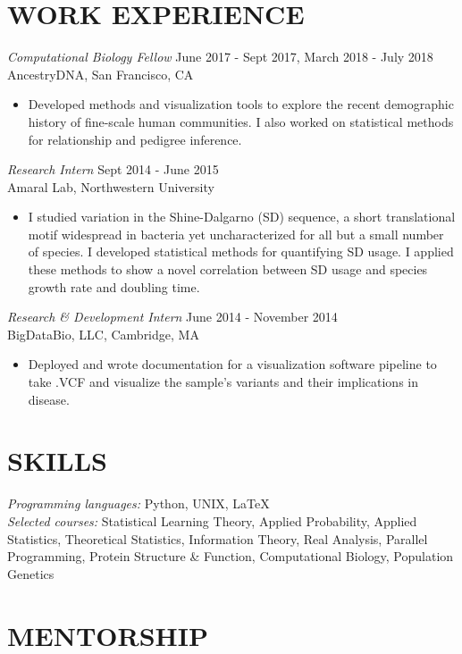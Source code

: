 \documentclass[margin, 10pt]{res} %
\begin{document}
\begin{resume}
\section{WORK EXPERIENCE}

{\sl Computational Biology Fellow} \hfill June 2017 - Sept 2017, March 2018 - July 2018 \\
AncestryDNA, San Francisco, CA
\begin{itemize}
\item[] Developed methods and visualization tools to explore the recent demographic history of fine-scale human communities. I also worked on statistical methods for relationship and pedigree inference. 
\end{itemize} 

{\sl Research Intern} \hfill Sept 2014 - June 2015 \\
Amaral Lab, Northwestern University
\begin{itemize}
\item[] I studied variation in the Shine-Dalgarno (SD) sequence, a short translational motif widespread in bacteria yet uncharacterized for all but a small number of species. I developed statistical methods for quantifying SD usage. I applied these methods to show a novel correlation between SD usage and species growth rate and doubling time.
\end{itemize} 

{\sl Research \& Development Intern} \hfill June 2014 - November 2014\\
BigDataBio, LLC, Cambridge, MA
\begin{itemize}
\item[] Deployed and wrote documentation for a visualization software pipeline to take .VCF and visualize the sample’s variants and their implications in disease.
\end{itemize} 


\section{SKILLS} 

{\sl Programming languages:} Python, UNIX, \LaTeX\\
{\sl Selected courses:} Statistical Learning Theory, Applied Probability, Applied Statistics, Theoretical Statistics, Information Theory, Real Analysis, Parallel Programming, Protein Structure \& Function, Computational Biology, Population Genetics

\section{MENTORSHIP}


\end{resume}
\end{document}
